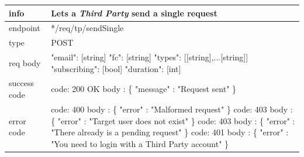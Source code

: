 \documentclass[titlepage]{article}
\begin{document}
	\vspace{\baselineskip}
	
	\begin{tabularx}{\textwidth}{lX} \hline
		info & Lets a {\it Third Party} send a single request \\ \hline
		endpoint & */req/tp/sendSingle \\ \hline
		type & POST \\ \hline
		req body & 
		"email": [string] \newline
		"fc": [string] \newline
		"types": [[string],...[string]] \newline
		"subscribing": [bool] \newline
		"duration": [int] \\ \hline
		success code &
		code: 200 OK \newline  
		body : \{ \newline
		"message" : "Request sent" \newline
		\} \\ \hline
		error code &
		code: 400 \newline
		body : \{ "error" : "Malformed request" \} \newline \newline
		code: 403 \newline
		body : \{ "error" : "Target user does not exist" \} \newline \newline
		code: 403 \newline
		body : \{ "error" : "There already is a pending request" \} \newline \newline
		code: 401 \newline
		body : \{ "error" : "You need to login with a Third Party account" \}\\ \hline
	\end{tabularx}
	
	\vspace{\baselineskip}
	
\end{document}
